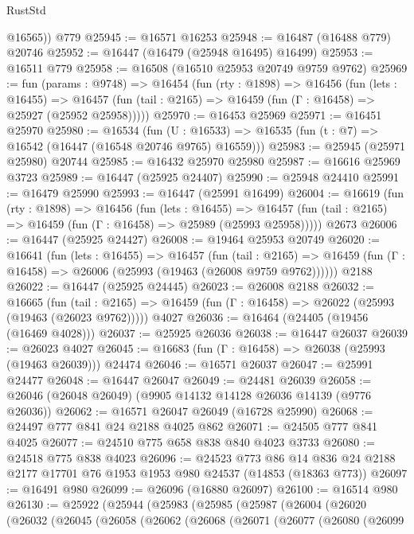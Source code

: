\begin{lexlean}{RustStd}
\begin{coremodule}
        @16565))
    @779
@25945 := @16571 @16253
@25948 := @16487 (@16488 @779) @20746
@25952 := @16447 (@16479 (@25948 @16495) @16499)
@25953 := @16511 @779
@25958 := @16508 (@16510 @25953 @20749 @9759 @9762)
@25969 := fun (params : @9748) =>
  @16454
    (fun (rty : @1898) =>
    @16456
      (fun (lets : @16455) =>
      @16457 (fun (tail : @2165) => @16459 (fun (Γ : @16458) => @25927 (@25952 @25958)))))
@25970 := @16453 @25969
@25971 := @16451 @25970
@25980 := @16534
    (fun (U : @16533) => @16535 (fun (t : @7) => @16542 (@16447 (@16548 @20746 @9765) @16559)))
@25983 := @25945 (@25971 @25980) @20744
@25985 := @16432 @25970 @25980
@25987 := @16616 @25969 @3723
@25989 := @16447 (@25925 @24407)
@25990 := @25948 @24410
@25991 := @16479 @25990
@25993 := @16447 (@25991 @16499)
@26004 := @16619
    (fun (rty : @1898) =>
    @16456
      (fun (lets : @16455) =>
      @16457 (fun (tail : @2165) => @16459 (fun (Γ : @16458) => @25989 (@25993 @25958)))))
    @2673
@26006 := @16447 (@25925 @24427)
@26008 := @19464 @25953 @20749
@26020 := @16641
    (fun (lets : @16455) =>
    @16457
      (fun (tail : @2165) =>
      @16459 (fun (Γ : @16458) => @26006 (@25993 (@19463 (@26008 @9759 @9762))))))
    @2188
@26022 := @16447 (@25925 @24445)
@26023 := @26008 @2188
@26032 := @16665
    (fun (tail : @2165) => @16459 (fun (Γ : @16458) => @26022 (@25993 (@19463 (@26023 @9762)))))
    @4027
@26036 := @16464 (@24405 (@19456 (@16469 @4028)))
@26037 := @25925 @26036
@26038 := @16447 @26037
@26039 := @26023 @4027
@26045 := @16683 (fun (Γ : @16458) => @26038 (@25993 (@19463 @26039))) @24474
@26046 := @16571 @26037
@26047 := @25991 @24477
@26048 := @16447 @26047
@26049 := @24481 @26039
@26058 := @26046 (@26048 @26049) (@9905 @14132 @14128 @26036 @14139 (@9776 @26036))
@26062 := @16571 @26047 @26049 (@16728 @25990)
@26068 := @24497 @777 @841 @24 @2188 @4025 @862
@26071 := @24505 @777 @841 @4025
@26077 := @24510 @775 @658 @838 @840 @4023 @3733
@26080 := @24518 @775 @838 @4023
@26096 := @24523
    @773
    @86
    @14
    @836
    @24
    @2188
    @2177
    @17701
    @76
    @1953
    @1953
    @980
    @24537
    (@14853 (@18363 @773))
@26097 := @16491 @980
@26099 := @26096 (@16880 @26097)
@26100 := @16514 @980
@26130 := @25922
    (@25944
      (@25983
        (@25985
          (@25987
            (@26004
              (@26020
                (@26032
                  (@26045
                    (@26058
                      (@26062
                        (@26068
                          (@26071
                            (@26077
                              (@26080
                                (@26099

\end{coremodule}
\end{lexlean}

